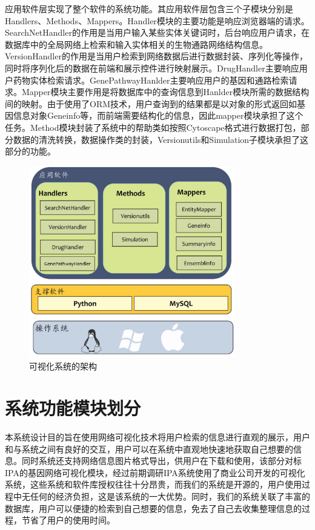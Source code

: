 应用软件层实现了整个软件的系统功能。其应用软件层包含三个子模块分别是Handlers、Methods、Mappers。Handler模块的主要功能是响应浏览器端的请求。SearchNetHandler的作用是当用户输入某些实体关键词时，后台响应用户请求，在数据库中的全局网络上检索和输入实体相关的生物通路网络结构信息。VersionHandler的作用是当用户检索到网络数据后进行数据封装、序列化等操作，同时将序列化后的数据在前端和展示控件进行映射展示。DrugHandler主要响应用户药物实体检索请求。GenePathwayHanlder主要响应用户的基因和通路检索请求。Mapper模块主要作用是将数据库中的查询信息到Hanlder模块所需的数据结构间的映射。由于使用了ORM技术，用户查询到的结果都是以对象的形式返回如基因信息对象Geneinfo等，而前端需要结构化的信息，因此mapper模块承担了这个任务。Method模块封装了系统中的帮助类如按照Cytoscape格式进行数据打包，部分数据的清洗转换，数据操作类的封装，Versionutils和Simulation子模块承担了这部分的功能。
\begin{figure}[h]
\centering
\includegraphics[width = 0.8\textwidth]{framework}
\caption[fig31]{可视化系统的架构}
\label{fig31}
\end{figure}

\section{系统功能模块划分}
本系统设计目的旨在使用网络可视化技术将用户检索的信息进行直观的展示，用户和与系统之间有良好的交互，用户可以在系统中直观地快速地获取自己想要的信息。同时系统还支持网络信息图片格式导出，供用户在下载和使用，该部分对标IPA的基因网络可视化模块，经过前期调研IPA系统使用了商业公司开发的可视化系统，这些系统和软件库授权往往十分昂贵，而我们的系统是开源的，用户使用过程中无任何的经济负担，这是该系统的一大优势。同时，我们的系统关联了丰富的数据库，用户可以便捷的检索到自己想要的信息，免去了自己去收集整理信息的过程，节省了用户的使用时间。

